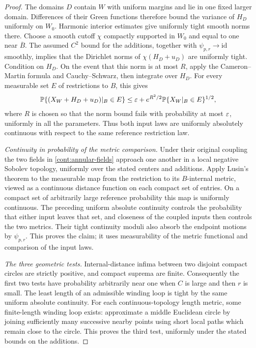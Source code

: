 \begin{proof}
The domains $D$ contain $W$ with uniform margins and lie in one fixed
larger domain.  Differences of their Green functions therefore bound the
variance of $H_D$ uniformly on $W_0$.  Harmonic interior estimates give
uniformly tight smooth norms there.  Choose a smooth cutoff $\chi$ compactly
supported in $W_0$ and equal to one near $\overline B$.  The assumed $C^2$
bound for the additions, together with $\psi_{p,r}\to\mathrm{id}$ smoothly,
implies that the Dirichlet norms of $\chi(H_D+u_D)$ are uniformly tight.
Condition on $H_D$.  On the event that this norm is at most $R$, apply
the Cameron--Martin formula and Cauchy--Schwarz, then integrate over $H_D$.
For every measurable set $E$ of restrictions to $B$, this gives
\[
 \mathbb P\{(X_W+H_D+u_D)|_B\in E\}
 \le \varepsilon+e^{R^2/2}\mathbb P\{X_W|_B\in E\}^{1/2},
\]
where $R$ is chosen so that the norm bound fails with probability at most
$\varepsilon$, uniformly in all the parameters.  Thus both input laws are
uniformly absolutely continuous with respect to the same reference
restriction law.

\emph{Continuity in probability of the metric comparison.}
Under their original coupling the two fields in
\eqref{cont:annular-fields} approach one another in a local negative Sobolev
topology, uniformly over the stated centers and additions.  Apply Lusin's
theorem to the measurable map from the restriction
to its $B$-internal metric, viewed as a continuous distance function on each
compact set of entries.  On a compact set of arbitrarily large reference
probability this map is uniformly continuous.  The preceding uniform
absolute continuity controls the probability that either input leaves
that set, and closeness of the coupled inputs then controls the two
metrics.  Their tight continuity moduli also absorb the endpoint motions
by $\psi_{p,r}$.  This proves the claim; it uses measurability of the metric
functional and comparison of the input laws.

\emph{The three geometric tests.}
Internal-distance infima between two disjoint compact circles are strictly
positive, and compact suprema are finite.  Consequently the first two tests
have probability arbitrarily near one when $C$ is large and then $r$ is
small.  The least length of an admissible winding loop is tight by the
same uniform absolute continuity.  For each continuous-topology length
metric, some finite-length winding loop exists: approximate a middle
Euclidean circle by joining sufficiently many successive nearby points
using short local paths which remain close to the circle.  This proves
the third test, uniformly under the stated bounds on the additions.
\end{proof}

